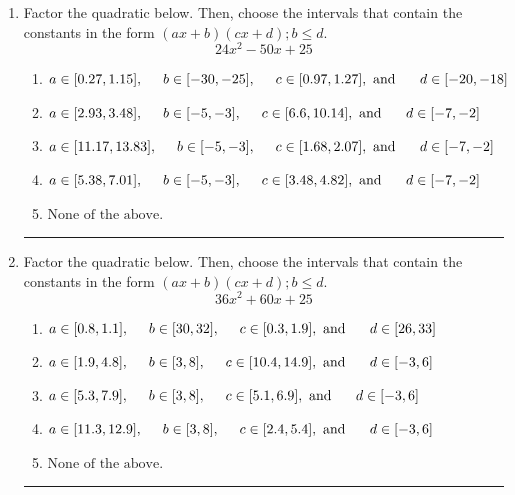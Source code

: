 \documentclass[14pt]{extbook}
\newcommand{\litem}[1]{\item#1\hspace*{-1cm}\rule{\textwidth}{0.4pt}}
\begin{document}
\begin{enumerate}
\litem{
Factor the quadratic below. Then, choose the intervals that contain the constants in the form $(ax+b)(cx+d); b \leq d.$\[ 24x^{2} -50 x + 25 \]\begin{enumerate}[label=\Alph*.]
\item \( a \in [0.27, 1.15], \hspace*{5mm} b \in [-30, -25], \hspace*{5mm} c \in [0.97, 1.27], \text{ and } \hspace*{5mm} d \in [-20, -18] \)
\item \( a \in [2.93, 3.48], \hspace*{5mm} b \in [-5, -3], \hspace*{5mm} c \in [6.6, 10.14], \text{ and } \hspace*{5mm} d \in [-7, -2] \)
\item \( a \in [11.17, 13.83], \hspace*{5mm} b \in [-5, -3], \hspace*{5mm} c \in [1.68, 2.07], \text{ and } \hspace*{5mm} d \in [-7, -2] \)
\item \( a \in [5.38, 7.01], \hspace*{5mm} b \in [-5, -3], \hspace*{5mm} c \in [3.48, 4.82], \text{ and } \hspace*{5mm} d \in [-7, -2] \)
\item \( \text{None of the above.} \)

\end{enumerate} }
\litem{
Factor the quadratic below. Then, choose the intervals that contain the constants in the form $(ax+b)(cx+d); b \leq d.$\[ 36x^{2} +60 x + 25 \]\begin{enumerate}[label=\Alph*.]
\item \( a \in [0.8, 1.1], \hspace*{5mm} b \in [30, 32], \hspace*{5mm} c \in [0.3, 1.9], \text{ and } \hspace*{5mm} d \in [26, 33] \)
\item \( a \in [1.9, 4.8], \hspace*{5mm} b \in [3, 8], \hspace*{5mm} c \in [10.4, 14.9], \text{ and } \hspace*{5mm} d \in [-3, 6] \)
\item \( a \in [5.3, 7.9], \hspace*{5mm} b \in [3, 8], \hspace*{5mm} c \in [5.1, 6.9], \text{ and } \hspace*{5mm} d \in [-3, 6] \)
\item \( a \in [11.3, 12.9], \hspace*{5mm} b \in [3, 8], \hspace*{5mm} c \in [2.4, 5.4], \text{ and } \hspace*{5mm} d \in [-3, 6] \)
\item \( \text{None of the above.} \)


\end{enumerate}}
\end{enumerate}
\end{document}

